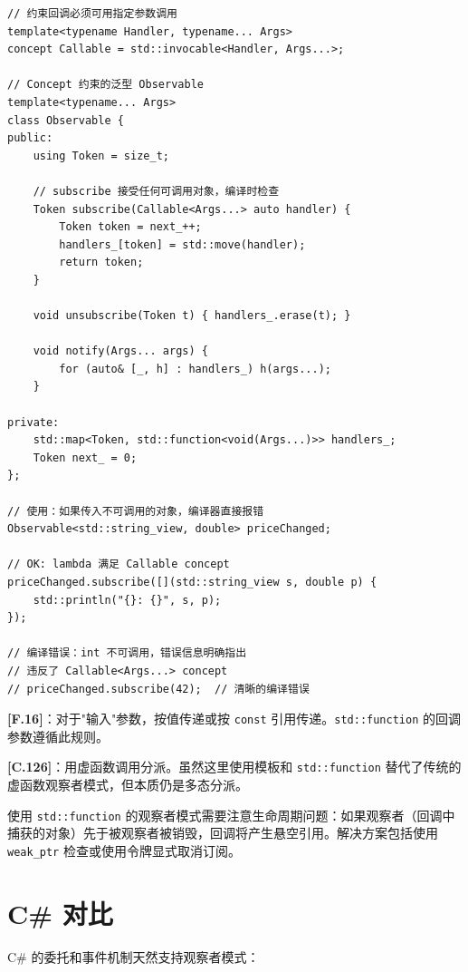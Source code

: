 \documentclass[12pt,a4paper,fontset=fandol]{ctexbook}
\newcommand{\guideref}[1]{\textbf{\textcolor{blue!70!black}{[#1]}}}
\begin{document}
\begin{lstlisting}[style=cppstyle, caption={Concept 约束的 Observer --- C++20}]
// 约束回调必须可用指定参数调用
template<typename Handler, typename... Args>
concept Callable = std::invocable<Handler, Args...>;

// Concept 约束的泛型 Observable
template<typename... Args>
class Observable {
public:
    using Token = size_t;

    // subscribe 接受任何可调用对象，编译时检查
    Token subscribe(Callable<Args...> auto handler) {
        Token token = next_++;
        handlers_[token] = std::move(handler);
        return token;
    }

    void unsubscribe(Token t) { handlers_.erase(t); }

    void notify(Args... args) {
        for (auto& [_, h] : handlers_) h(args...);
    }

private:
    std::map<Token, std::function<void(Args...)>> handlers_;
    Token next_ = 0;
};

// 使用：如果传入不可调用的对象，编译器直接报错
Observable<std::string_view, double> priceChanged;

// OK: lambda 满足 Callable concept
priceChanged.subscribe([](std::string_view s, double p) {
    std::println("{}: {}", s, p);
});

// 编译错误：int 不可调用，错误信息明确指出
// 违反了 Callable<Args...> concept
// priceChanged.subscribe(42);  // 清晰的编译错误
\end{lstlisting}

\begin{guideline}
\guideref{F.16}：对于"输入"参数，按值传递或按 \texttt{const} 引用传递。\texttt{std::function} 的回调参数遵循此规则。

\guideref{C.126}：用虚函数调用分派。虽然这里使用模板和 \texttt{std::function} 替代了传统的虚函数观察者模式，但本质仍是多态分派。
\end{guideline}

\begin{note}
使用 \texttt{std::function} 的观察者模式需要注意生命周期问题：如果观察者（回调中捕获的对象）先于被观察者被销毁，回调将产生悬空引用。解决方案包括使用 \texttt{weak\_ptr} 检查或使用令牌显式取消订阅。
\end{note}

\section{C\# 对比}

C\# 的委托和事件机制天然支持观察者模式：
\end{document}
